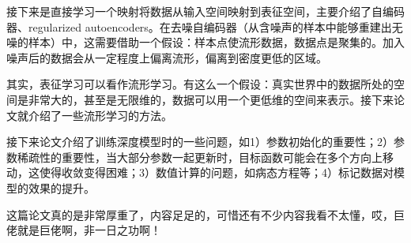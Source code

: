 接下来是直接学习一个映射将数据从输入空间映射到表征空间，主要介绍了自编码器、regularized autoencoders。在去噪自编码器（从含噪声的样本中能够重建出无噪的样本）中，这需要借助一个假设：样本点使流形数据，数据点是聚集的。加入噪声后的数据会从一定程度上偏离流形，偏离到密度更低的区域。

其实，表征学习可以看作流形学习。有这么一个假设：真实世界中的数据所处的空间是非常大的，甚至是无限维的，数据可以用一个更低维的空间来表示。接下来论文就介绍了一些流形学习的方法。

接下来论文介绍了训练深度模型时的一些问题，如1）参数初始化的重要性；2）参数稀疏性的重要性，当大部分参数一起更新时，目标函数可能会在多个方向上移动，这使得收敛变得困难；3）数值计算的问题，如病态方程等；4）标记数据对模型的效果的提升。

这篇论文真的是非常厚重了，内容足足的，可惜还有不少内容我看不太懂，哎，巨佬就是巨佬啊，非一日之功啊！